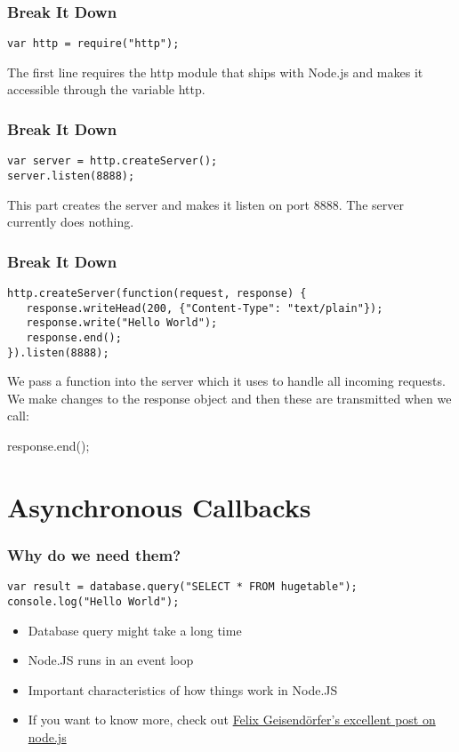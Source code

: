 \documentclass[ignorenonframetext,]{beamer}
\begin{document}
\begin{frame}[fragile]\frametitle{Break It Down}

\begin{verbatim}
var http = require("http");
\end{verbatim}
The first line requires the http module that ships with Node.js and
makes it accessible through the variable http.

\end{frame}

\begin{frame}[fragile]\frametitle{Break It Down}

\begin{verbatim}
var server = http.createServer();
server.listen(8888); 
\end{verbatim}
This part creates the server and makes it listen on port 8888. The
server currently does nothing.

\end{frame}

\begin{frame}[fragile]\frametitle{Break It Down}

\begin{verbatim}
http.createServer(function(request, response) {
   response.writeHead(200, {"Content-Type": "text/plain"});
   response.write("Hello World");
   response.end();
}).listen(8888);
\end{verbatim}
We pass a function into the server which it uses to handle all incoming
requests. We make changes to the response object and then these are
transmitted when we call:

response.end();

\end{frame}

\section{Asynchronous Callbacks}

\begin{frame}[fragile]\frametitle{Why do we need them?}

\begin{verbatim}
var result = database.query("SELECT * FROM hugetable");
console.log("Hello World");
\end{verbatim}
\begin{itemize}
\item
  Database query might take a long time
\item
  Node.JS runs in an event loop
\item
  Important characteristics of how things work in Node.JS
\item
  If you want to know more, check out
  \href{http://debuggable.com/posts/understanding-node-js:4bd98440-45e4-4a9a-8ef7-0f7ecbdd56cb}{Felix
  Geisendörfer's excellent post on node.js}
\end{itemize}
\end{frame}
\end{document}
